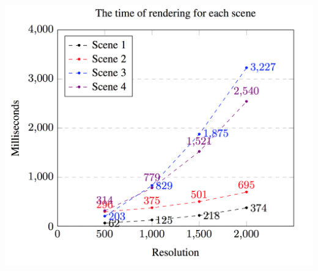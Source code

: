 \documentclass[a0,portrait]{a0poster}
\begin{document}
\begin{multicols}{2}
\begin{center}\vspace{1cm}
\includegraphics[width=0.8\linewidth]{results_rendered}
\end{center}\vspace{1cm}





\end{multicols}
\end{document}

